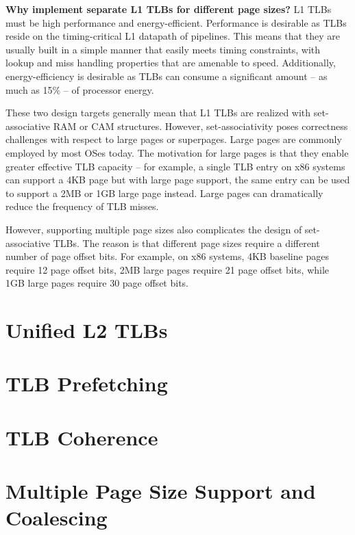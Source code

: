 \documentclass{article}
\begin{document}
\vspace{2mm}
{\noindent \bf Why implement separate L1 TLBs for different page sizes?} L1 TLBs must be high performance and energy-efficient. Performance is desirable as TLBs reside on the timing-critical L1 datapath of pipelines. This means that they are usually built in a simple manner that easily meets timing constraints, with lookup and miss handling properties that are amenable to speed. Additionally, energy-efficiency is desirable as TLBs can consume a significant amount -- as much as 15\% -- of processor energy. 

These two design targets generally mean that L1 TLBs are realized with set-associa\-tive RAM or CAM structures. However, set-associativity poses correctness challenges with respect to large pages or superpages. Large pages are commonly employed by most OSes today. The motivation for large pages is that they enable greater effective TLB capacity -- for example, a single TLB entry on x86 systems can support a 4KB page but with large page support, the same entry can be used to support a 2MB or 1GB large page instead. Large pages can dramatically reduce the frequency of TLB misses.

However, supporting multiple page sizes also complicates the design of set-associat\-ive TLBs. The reason is that different page sizes require a different number of page offset bits. For example, on x86 systems, 4KB baseline pages require 12 page offset bits, 2MB large pages require 21 page offset bits, while 1GB large pages require 30 page offset bits. 



\section{Unified L2 TLBs}\label{sec:unified-l2-tlbs}

\section{TLB Prefetching}\label{sec:tlb-prefetching}

\section{TLB Coherence}\label{sec:tlb-coherence}

\section{Multiple Page Size Support and Coalescing}\label{sec:tlb-multiple-page-size-coalescing}
\end{document}
